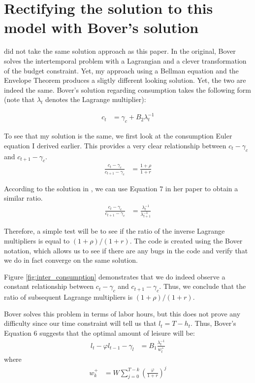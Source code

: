 \documentclass[\econtexRoot/ProjectMMD]{subfiles}
\begin{document}
\section{Rectifying the solution to this model with Bover's solution}

\cite{bover1991relaxing} did not take the same solution approach as this paper. In the original, Bover solves the intertemporal problem with a Lagrangian and a clever transformation of the budget constraint. Yet, my approach using a Bellman equation and the Envelope Theorem produces a sligtly different looking solution. Yet, the two are indeed the same. Bover's solution regarding consumption takes the following form (note that $\lambda_t$ denotes the Lagrange multiplier):

\begin{align*}
  c_t &= \gamma_c + B_2 \lambda_t^{-1}
\end{align*}

To see that my solution is the same, we first look at the consumption Euler equation I derived earlier. This provides a very clear relationship between $c_t -\gamma_c$  and $c_{t+1} -\gamma_c$.
\begin{align*}
\frac{c_t - \gamma_c}{c_{t+1} - \gamma_c} &= \frac{1+\rho}{1+r}
\end{align*}

According to the solution in \cite{bover1991relaxing}, we can use Equation 7 in her paper to obtain a similar ratio.
\begin{align*}
  \frac{c_t - \gamma_c}{c_{t+1}-\gamma_c} &=  \frac{\lambda_t^{-1}}{\lambda_{t+1}^{-1}}
\end{align*}

Therefore, a simple test will be to see if the ratio of the inverse Lagrange multipliers is equal to $(1+\rho) / (1+r)$. The code is created using the Bover notation, which allows us to see if there are any bugs in the code and verify that we do in fact converge on the same solution.



Figure \ref{fig:inter_consumption} demonstrates that we do indeed observe a constant relationship between $c_t -\gamma_c$ and $c_{t+1} - \gamma_c$. Thus, we conclude that the ratio of subsequent Lagrange multipliers is $(1+\rho)/(1+r)$.


Bover solves this problem in terms of labor hours, but this does not prove any difficulty since our time constraint will tell us that $l_t = T-h_t$. Thus, Bover's Equation 6 suggests that the optimal amount of leisure will be:
\begin{align}
  l_t - \varphi l_{t-1} - \gamma_l &= B_1\frac{\lambda_t^{-1}}{w_t^{+}} \label{eq:bover_focl}
\end{align}
where
\begin{align*}
  w_k^{+} &=W \sum_{j=0}^{T-k}\left( \frac{\varphi}{1+r}\right) ^j
\end{align*}
\end{document}
